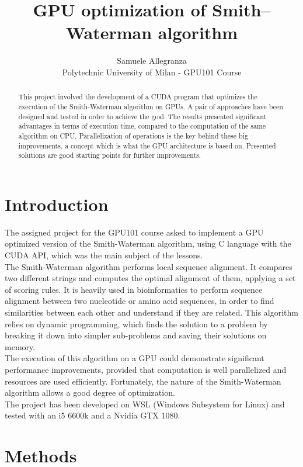 \documentclass{article}
\title{GPU optimization of Smith–Waterman algorithm}
\author{Samuele Allegranza \\
        \small Polytechnic University of Milan - GPU101 Course\\
}
\date{} %
\begin{document}
\maketitle

\begin{abstract} 
\noindent This project involved the development of a CUDA program that  optimizes the execution of the Smith-Waterman algorithm on GPUs. A pair of approaches have been designed and tested in order to achieve the goal. The results presented significant advantages in terms of execution time, compared to the computation of the same algorithm on CPU. Parallelization of operations is the key behind these big improvements, a concept which is what the GPU architecture is based on. Presented solutions are good starting points for further improvements. \end{abstract}

\section{Introduction}
\noindent
The assigned project for the GPU101 course asked to implement a GPU optimized version of the Smith-Waterman algorithm, using C language with the CUDA API, which was the main subject of the lessons.\\

\noindent The Smith-Waterman algorithm performs local sequence alignment. It compares two different strings and computes the optimal alignment of them, applying a set of scoring rules. It is heavily used in bioinformatics to perform sequence alignment between two nucleotide or amino acid sequences, in order to find similarities between each other and understand if they are related.
This algorithm relies on dynamic programming, which finds the solution to a problem by breaking it down into simpler sub-problems and saving their solutions on memory.\\

\noindent The execution of this algorithm on a GPU could demonstrate significant performance improvements, provided that computation is well parallelized and resources are used efficiently. Fortunately, the nature of the Smith-Waterman algorithm allows a good degree of optimization.\\
The project has been developed on WSL (Windows Subsystem for Linux) and tested with an i5 6600k and a Nvidia GTX 1080.

\section{Methods}
\end{document}
